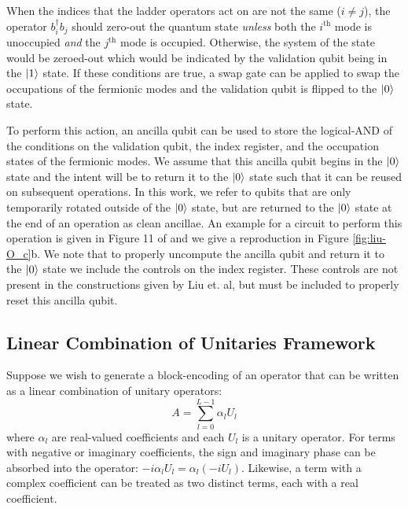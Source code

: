 When the indices that the ladder operators act on are not the same ($i \neq j$), the operator $b_i^\dagger b_j$ should zero-out the quantum state \textit{unless} both the $i^\text{th}$ mode is unoccupied \textit{and} the $j^\text{th}$ mode is occupied.
Otherwise, the system of the state would be zeroed-out which would be indicated by the validation qubit being in the $\ket{1}$ state.
If these conditions are true, a swap gate can be applied to swap the occupations of the fermionic modes and the validation qubit is flipped to the $\ket{0}$ state. 

To perform this action, an ancilla qubit can be used to store the logical-AND of the conditions on the validation qubit, the index register, and the occupation states of the fermionic modes.
We assume that this ancilla qubit begins in the $\ket{0}$ state and the intent will be to return it to the $\ket{0}$ state such that it can be reused on subsequent operations.
In this work, we refer to qubits that are only temporarily rotated outside of the $\ket{0}$ state, but are returned to the $\ket{0}$ state at the end of an operation as clean ancillae.
An example for a circuit to perform this operation is given in Figure 11 of \cite{liu2024efficient} and we give a reproduction in Figure \ref{fig:liu-O_c}b.
We note that to properly uncompute the ancilla qubit and return it to the $\ket{0}$ state we include the controls on the index register.
These controls are not present in the constructions given by Liu et. al, but must be included to properly reset this ancilla qubit.

\subsection{Linear Combination of Unitaries Framework}
\label{subsec:lcu}

Suppose we wish to generate a block-encoding of an operator that can be written as a linear combination of unitary operators:
\begin{equation}
    \label{eq:lcu}
    A = \sum_{l=0}^{L-1} \alpha_l U_l
\end{equation}
where $\alpha_l$ are  real-valued coefficients and each $U_l$ is a unitary operator.
For terms with negative or imaginary coefficients, the sign and imaginary phase can be absorbed into the operator: $-i \alpha_l U_l = \alpha_l (-i U_l)$.
Likewise, a term with a complex coefficient can be treated as two distinct terms, each with a real coefficient.

